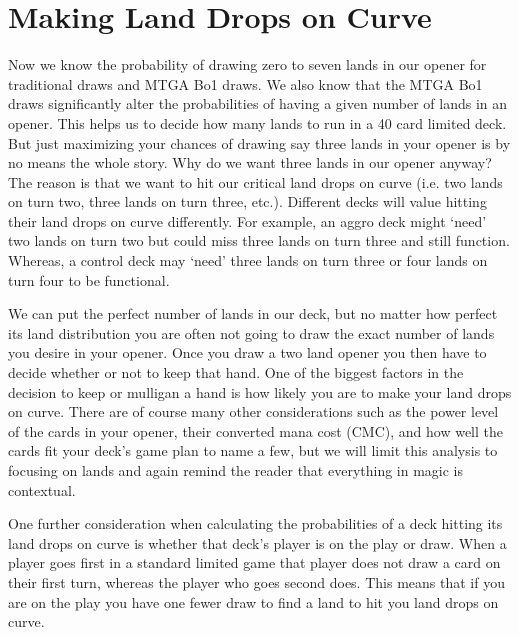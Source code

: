 \documentclass[oneside]{book}   %
\begin{document}
\section{Making Land Drops on Curve}
\label{curve}

Now we know the probability of drawing zero to seven lands in our opener for traditional draws and MTGA Bo1 draws. We also know that the MTGA Bo1 draws significantly alter the probabilities of having a given number of lands in an opener. This helps us to decide how many lands to run in a 40 card limited deck. But just maximizing your chances of drawing say three lands in your opener is by no means the whole story. Why do we want three lands in our opener anyway? The reason is that we want to hit our critical land drops on curve (i.e. two lands on turn two, three lands on turn three, etc.). Different decks will value hitting their land drops on curve differently. For example, an aggro deck might `need' two lands on turn two but could miss three lands on turn three and still function. Whereas, a control deck may `need' three lands on turn three or four lands on turn four to be functional. 

We can put the perfect number of lands in our deck, but no matter how perfect its land distribution you are often not going to draw the exact number of lands you desire in your opener. Once you draw a two land opener you then have to decide whether or not to keep that hand. One of the biggest factors in the decision to keep or mulligan a hand is how likely you are to make your land drops on curve. There are of course many other considerations such as the power level of the cards in your opener, their converted mana cost (CMC), and how well the cards fit your deck's game plan to name a few, but we will limit this analysis to focusing on lands and again remind the reader that everything in magic is contextual.

One further consideration when calculating the probabilities of a deck hitting its land drops on curve is whether that deck's player is on the play or draw. When a player goes first in a standard limited game that player does not draw a card on their first turn, whereas the player who goes second does. This means that if you are on the play you have one fewer draw to find a land to hit you land drops on curve. 
\end{document}

